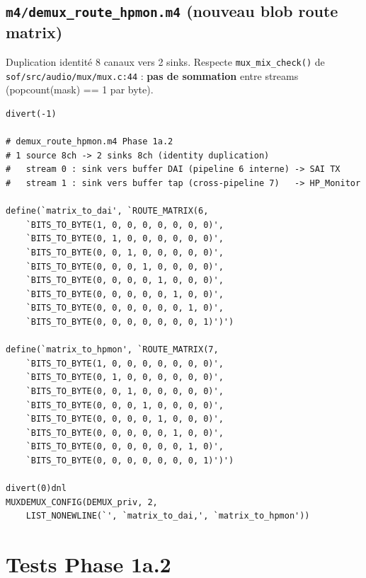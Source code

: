 \documentclass[11pt,a4paper]{article}
\begin{document}
\subsection{\texttt{m4/demux\_route\_hpmon.m4} (nouveau blob route matrix)}

Duplication identité 8 canaux vers 2 sinks. Respecte \texttt{mux\_mix\_check()} de \texttt{sof/src/audio/mux/mux.c:44} : \textbf{pas de sommation} entre streams (popcount(mask) == 1 par byte).

\begin{lstlisting}[language={}, basicstyle=\ttfamily\scriptsize]
divert(-1)

# demux_route_hpmon.m4 Phase 1a.2
# 1 source 8ch -> 2 sinks 8ch (identity duplication)
#   stream 0 : sink vers buffer DAI (pipeline 6 interne) -> SAI TX
#   stream 1 : sink vers buffer tap (cross-pipeline 7)   -> HP_Monitor

define(`matrix_to_dai', `ROUTE_MATRIX(6,
	`BITS_TO_BYTE(1, 0, 0, 0, 0, 0, 0, 0)',
	`BITS_TO_BYTE(0, 1, 0, 0, 0, 0, 0, 0)',
	`BITS_TO_BYTE(0, 0, 1, 0, 0, 0, 0, 0)',
	`BITS_TO_BYTE(0, 0, 0, 1, 0, 0, 0, 0)',
	`BITS_TO_BYTE(0, 0, 0, 0, 1, 0, 0, 0)',
	`BITS_TO_BYTE(0, 0, 0, 0, 0, 1, 0, 0)',
	`BITS_TO_BYTE(0, 0, 0, 0, 0, 0, 1, 0)',
	`BITS_TO_BYTE(0, 0, 0, 0, 0, 0, 0, 1)')')

define(`matrix_to_hpmon', `ROUTE_MATRIX(7,
	`BITS_TO_BYTE(1, 0, 0, 0, 0, 0, 0, 0)',
	`BITS_TO_BYTE(0, 1, 0, 0, 0, 0, 0, 0)',
	`BITS_TO_BYTE(0, 0, 1, 0, 0, 0, 0, 0)',
	`BITS_TO_BYTE(0, 0, 0, 1, 0, 0, 0, 0)',
	`BITS_TO_BYTE(0, 0, 0, 0, 1, 0, 0, 0)',
	`BITS_TO_BYTE(0, 0, 0, 0, 0, 1, 0, 0)',
	`BITS_TO_BYTE(0, 0, 0, 0, 0, 0, 1, 0)',
	`BITS_TO_BYTE(0, 0, 0, 0, 0, 0, 0, 1)')')

divert(0)dnl
MUXDEMUX_CONFIG(DEMUX_priv, 2,
	LIST_NONEWLINE(`', `matrix_to_dai,', `matrix_to_hpmon'))
\end{lstlisting}

\section{Tests Phase 1a.2}
\end{document}
